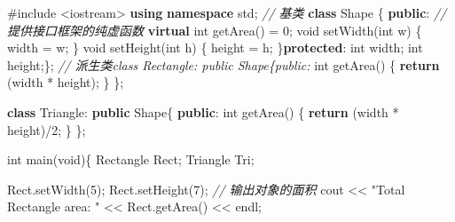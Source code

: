 \documentclass[
]{article}
\newenvironment{Shaded}{}{}
\newcommand{\CommentTok}[1]{\textcolor[rgb]{0.38,0.63,0.69}{\textit{#1}}}
\newcommand{\ControlFlowTok}[1]{\textcolor[rgb]{0.00,0.44,0.13}{\textbf{#1}}}
\newcommand{\DataTypeTok}[1]{\textcolor[rgb]{0.56,0.13,0.00}{#1}}
\newcommand{\DecValTok}[1]{\textcolor[rgb]{0.25,0.63,0.44}{#1}}
\newcommand{\ImportTok}[1]{#1}
\newcommand{\KeywordTok}[1]{\textcolor[rgb]{0.00,0.44,0.13}{\textbf{#1}}}
\newcommand{\NormalTok}[1]{#1}
\newcommand{\OperatorTok}[1]{\textcolor[rgb]{0.40,0.40,0.40}{#1}}
\newcommand{\PreprocessorTok}[1]{\textcolor[rgb]{0.74,0.48,0.00}{#1}}
\newcommand{\StringTok}[1]{\textcolor[rgb]{0.25,0.44,0.63}{#1}}
\begin{document}
\begin{Shaded}
\begin{Highlighting}[]
\PreprocessorTok{\#include }\ImportTok{\textless{}iostream\textgreater{}}
 \KeywordTok{using} \KeywordTok{namespace}\NormalTok{ std}\OperatorTok{;}
 \CommentTok{// 基类}
\KeywordTok{class}\NormalTok{ Shape }\OperatorTok{\{}
\KeywordTok{public}\OperatorTok{:}
   \CommentTok{// 提供接口框架的纯虚函数}
   \KeywordTok{virtual} \DataTypeTok{int}\NormalTok{ getArea}\OperatorTok{()} \OperatorTok{=} \DecValTok{0}\OperatorTok{;}
   \DataTypeTok{void}\NormalTok{ setWidth}\OperatorTok{(}\DataTypeTok{int}\NormalTok{ w}\OperatorTok{)}
   \OperatorTok{\{}
\NormalTok{      width }\OperatorTok{=}\NormalTok{ w}\OperatorTok{;}
   \OperatorTok{\}}
   \DataTypeTok{void}\NormalTok{ setHeight}\OperatorTok{(}\DataTypeTok{int}\NormalTok{ h}\OperatorTok{)}
   \OperatorTok{\{}
\NormalTok{      height }\OperatorTok{=}\NormalTok{ h}\OperatorTok{;}
   \OperatorTok{\}}\KeywordTok{protected}\OperatorTok{:}
   \DataTypeTok{int}\NormalTok{ width}\OperatorTok{;}
   \DataTypeTok{int}\NormalTok{ height}\OperatorTok{;\};}
 \CommentTok{// 派生类class Rectangle: public Shape\{public:}
   \DataTypeTok{int}\NormalTok{ getArea}\OperatorTok{()}
   \OperatorTok{\{} 
      \ControlFlowTok{return} \OperatorTok{(}\NormalTok{width }\OperatorTok{*}\NormalTok{ height}\OperatorTok{);} 
   \OperatorTok{\}}
\OperatorTok{\};}

\KeywordTok{class}\NormalTok{ Triangle}\OperatorTok{:} \KeywordTok{public}\NormalTok{ Shape}\OperatorTok{\{}
\KeywordTok{public}\OperatorTok{:}
   \DataTypeTok{int}\NormalTok{ getArea}\OperatorTok{()}
   \OperatorTok{\{} 
      \ControlFlowTok{return} \OperatorTok{(}\NormalTok{width }\OperatorTok{*}\NormalTok{ height}\OperatorTok{)/}\DecValTok{2}\OperatorTok{;} 
   \OperatorTok{\}}
\OperatorTok{\};}

\DataTypeTok{int}\NormalTok{ main}\OperatorTok{(}\DataTypeTok{void}\OperatorTok{)\{}
\NormalTok{   Rectangle Rect}\OperatorTok{;}
\NormalTok{   Triangle  Tri}\OperatorTok{;}
 
\NormalTok{   Rect}\OperatorTok{.}\NormalTok{setWidth}\OperatorTok{(}\DecValTok{5}\OperatorTok{);}
\NormalTok{   Rect}\OperatorTok{.}\NormalTok{setHeight}\OperatorTok{(}\DecValTok{7}\OperatorTok{);}
   \CommentTok{// 输出对象的面积}
\NormalTok{   cout }\OperatorTok{\textless{}\textless{}} \StringTok{"Total Rectangle area: "} \OperatorTok{\textless{}\textless{}}\NormalTok{ Rect}\OperatorTok{.}\NormalTok{getArea}\OperatorTok{()} \OperatorTok{\textless{}\textless{}}\NormalTok{ endl}\OperatorTok{;}


\end{Highlighting}
\end{Shaded}
\end{document}
